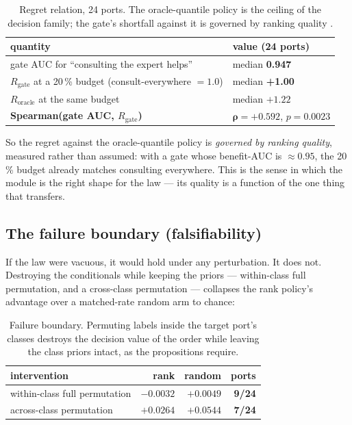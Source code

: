 \documentclass[journal]{IEEEtran}
\begin{document}
\begin{table}[t]
\caption{Regret relation, 24 ports. The oracle-quantile policy is the ceiling of the decision family;
the gate's shortfall against it is governed by ranking quality \cite{chow1970optimum,geifman2017selective}.}
\label{tab:regret}
\centering
\footnotesize
\begin{tabular}{@{}L{5.4cm}L{1.6cm}@{}}
\toprule
quantity & value (24 ports) \\
\midrule
gate AUC for ``consulting the expert helps'' & median \textbf{0.947} \\
$R_{\text{gate}}$ at a 20\,\% budget (consult-everywhere $=1.0$) & median \textbf{+1.00} \\
$R_{\text{oracle}}$ at the same budget & median $+1.22$ \\
\textbf{Spearman(gate AUC, $R_{\text{gate}}$)} & $\boldsymbol{\rho = +0.592}$, $p = 0.0023$ \\
\bottomrule
\end{tabular}
\end{table}

So the regret against the oracle-quantile policy is \emph{governed by ranking quality}, measured rather
than assumed: with a gate whose benefit-AUC is $\approx 0.95$, the 20\,\% budget already matches
consulting everywhere. This is the sense in which the module is the right shape for the law --- its
quality is a function of the one thing that transfers.

\subsection{The failure boundary (falsifiability)}
\label{sec:boundary}

If the law were vacuous, it would hold under any perturbation. It does not. Destroying the conditionals
while keeping the priors --- within-class full permutation, and a cross-class permutation --- collapses
the rank policy's advantage over a matched-rate random arm to chance:

\begin{table}[t]
\caption{Failure boundary. Permuting labels inside the target port's classes destroys the decision
value of the order while leaving the class priors intact, as the propositions require.}
\label{tab:boundary}
\centering
\footnotesize
\begin{tabular}{@{}L{3.4cm}rrr@{}}
\toprule
intervention & rank & random & ports \\
\midrule
within-class full permutation & $\mathbf{-0.0032}$ & $+0.0049$ & \textbf{9/24} \\
across-class permutation & $+0.0264$ & $+0.0544$ & \textbf{7/24} \\
\bottomrule
\end{tabular}
\end{table}
\end{document}
